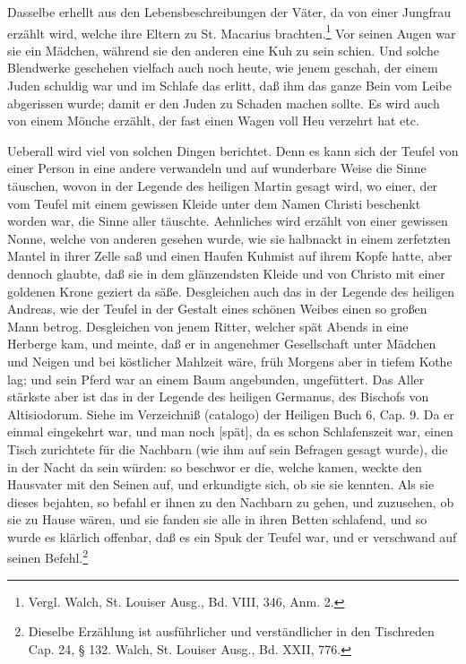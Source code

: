 Dasselbe erhellt aus den Lebensbeschreibungen der Väter, da von einer Jungfrau erzählt wird, welche ihre Eltern zu St. Macarius brachten.\footnote{Vergl. Walch, St. Louiser Ausg., Bd. VIII, 346, Anm. 2.} Vor seinen Augen war sie ein Mädchen, während sie den anderen eine Kuh zu sein schien. Und solche Blendwerke geschehen vielfach auch noch heute, wie jenem geschah, der einem Juden schuldig war und im Schlafe das erlitt, daß ihm das ganze Bein vom Leibe abgerissen wurde; damit er den Juden zu Schaden machen sollte. Es wird auch von einem Mönche erzählt, der fast einen Wagen voll Heu verzehrt hat etc.

Ueberall wird viel von solchen Dingen berichtet. Denn es kann sich der Teufel von einer Person in eine andere verwandeln und auf wunderbare Weise die Sinne täuschen, wovon in der Legende des heiligen Martin gesagt wird, wo einer, der vom Teufel mit einem gewissen Kleide unter dem Namen Christi beschenkt worden war, die Sinne aller täuschte. Aehnliches wird erzählt von einer gewissen Nonne, welche von anderen gesehen wurde, wie sie halbnackt in einem zerfetzten Mantel in ihrer Zelle saß und einen Haufen Kuhmist auf ihrem Kopfe hatte, aber dennoch glaubte, daß sie in dem glänzendsten Kleide und von Christo mit einer goldenen Krone geziert da säße. Desgleichen auch das in der Legende des heiligen Andreas, wie der Teufel in der Gestalt eines schönen Weibes einen so großen Mann betrog. Desgleichen von jenem Ritter, welcher spät Abends in eine Herberge kam, und meinte, daß er in angenehmer Gesellschaft unter Mädchen und Neigen und bei köstlicher Mahlzeit wäre, früh Morgens aber in tiefem Kothe lag; und sein Pferd war an einem Baum angebunden, ungefüttert. Das Aller stärkste aber ist das in der Legende des heiligen Germanus, des Bischofs von Altisiodorum. Siehe im Verzeichniß (catalogo) der Heiligen Buch 6, Cap. 9. Da er einmal eingekehrt war, und man noch [spät], da es schon Schlafenszeit war, einen Tisch zurichtete für die Nachbarn (wie ihm auf sein Befragen gesagt wurde), die in der Nacht da sein würden: so beschwor er die, welche kamen, weckte den Hausvater mit den Seinen auf, und erkundigte sich, ob sie sie kennten. Als sie dieses bejahten, so befahl er ihnen zu den Nachbarn zu gehen, und zuzusehen, ob sie zu Hause wären, und sie fanden sie alle in ihren Betten schlafend, und so wurde es klärlich offenbar, daß es ein Spuk der Teufel war, und er verschwand auf seinen Befehl.\footnote{Dieselbe Erzählung ist ausführlicher und verständlicher in den Tischreden Cap. 24, § 132. Walch, St. Louiser Ausg., Bd. XXII, 776.}

